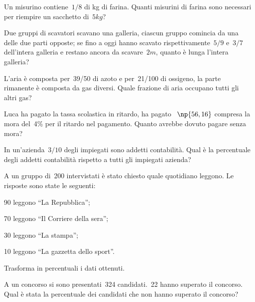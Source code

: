 \begin{multicols}{2}
\begin{esercizio}
 Un misurino contiene~$1/8$ di kg di farina. Quanti misurini di farina
sono necessari per riempire un sacchetto di~$5\unit{kg}$?
\end{esercizio}

\begin{esercizio}[\Ast]
 Due gruppi di scavatori scavano una galleria, ciascun gruppo comincia
da una delle due parti opposte; se fino a oggi hanno scavato
rispettivamente~$5/9$ e~$3/7$ dell'intera galleria e
restano ancora da scavare~$2\unit{m}$, quanto è lunga
l'intera galleria?
\end{esercizio}

\begin{esercizio}[\Ast]
 L'aria è composta per~39/50 di azoto e per~21/100 di
ossigeno, la parte rimanente è composta da gas diversi. Quale
frazione di aria occupano tutti gli altri gas?
\end{esercizio}

\begin{esercizio}[\Ast]
 Luca ha pagato la tassa scolastica in ritardo, ha pagato \officialeuro~$\np{56,16}$
compresa la mora del~4\% per il ritardo nel pagamento.
Quanto avrebbe dovuto pagare senza mora?
\end{esercizio}

\begin{esercizio}
 In un'azienda~$3/10$ degli impiegati sono addetti
contabilità. Qual è la percentuale degli addetti contabilità
rispetto a tutti gli impiegati azienda?
\end{esercizio}

\begin{esercizio}
 A un gruppo di~200 intervistati è stato chiesto quale quotidiano
leggono. Le risposte sono state le seguenti:
\begin{itemize*}
\item 90 leggono ``La Repubblica'';
\item 70 leggono ``Il Corriere della sera'';
\item 30 leggono ``La stampa'';
\item 10 leggono ``La gazzetta dello sport''.
\end{itemize*}
Trasforma in percentuali i dati ottenuti.
\end{esercizio}

\begin{esercizio}
 A un concorso si sono presentati~324 candidati.~22 hanno superato il
concorso. Qual è stata la percentuale dei candidati che non hanno
superato il concorso?
\end{esercizio}


\end{multicols}
